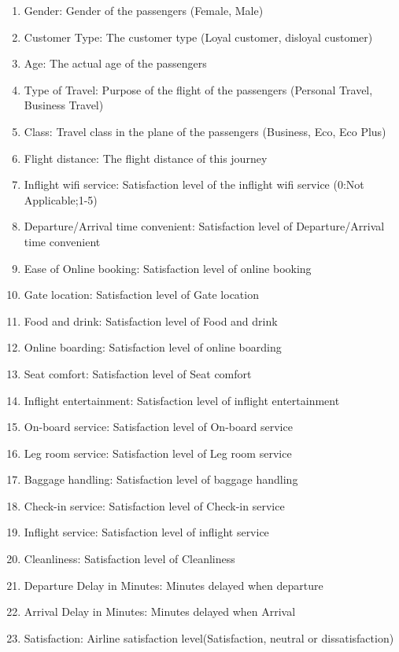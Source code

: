 \documentclass[
]{article}
\providecommand{\tightlist}{%
  \setlength{\itemsep}{0pt}\setlength{\parskip}{0pt}}
\begin{document}
\begin{enumerate}
\def\labelenumi{\arabic{enumi}.}
\tightlist
\item
  Gender: Gender of the passengers (Female, Male)
\item
  Customer Type: The customer type (Loyal customer, disloyal customer)
\item
  Age: The actual age of the passengers
\item
  Type of Travel: Purpose of the flight of the passengers (Personal
  Travel, Business Travel)
\item
  Class: Travel class in the plane of the passengers (Business, Eco, Eco
  Plus)
\item
  Flight distance: The flight distance of this journey
\item
  Inflight wifi service: Satisfaction level of the inflight wifi service
  (0:Not Applicable;1-5)
\item
  Departure/Arrival time convenient: Satisfaction level of
  Departure/Arrival time convenient
\item
  Ease of Online booking: Satisfaction level of online booking
\item
  Gate location: Satisfaction level of Gate location
\item
  Food and drink: Satisfaction level of Food and drink
\item
  Online boarding: Satisfaction level of online boarding
\item
  Seat comfort: Satisfaction level of Seat comfort
\item
  Inflight entertainment: Satisfaction level of inflight entertainment
\item
  On-board service: Satisfaction level of On-board service
\item
  Leg room service: Satisfaction level of Leg room service
\item
  Baggage handling: Satisfaction level of baggage handling
\item
  Check-in service: Satisfaction level of Check-in service
\item
  Inflight service: Satisfaction level of inflight service
\item
  Cleanliness: Satisfaction level of Cleanliness
\item
  Departure Delay in Minutes: Minutes delayed when departure
\item
  Arrival Delay in Minutes: Minutes delayed when Arrival
\item
  Satisfaction: Airline satisfaction level(Satisfaction, neutral or
  dissatisfaction)
\end{enumerate}
\end{document}
